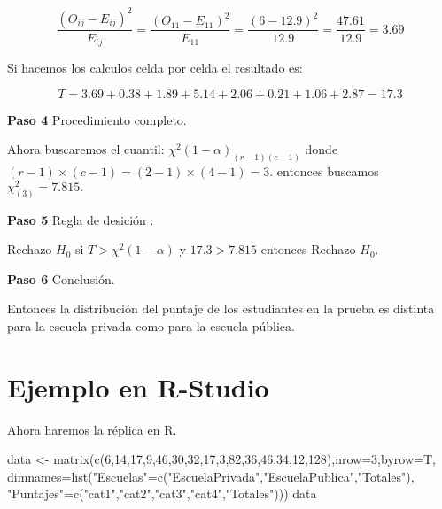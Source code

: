 \documentclass[
  a4paper,
  oneside,
  openany]{book}
\newenvironment{Shaded}{\begin{snugshade}}{\end{snugshade}}
\newcommand{\AttributeTok}[1]{\textcolor[rgb]{0.77,0.63,0.00}{#1}}
\newcommand{\DecValTok}[1]{\textcolor[rgb]{0.00,0.00,0.81}{#1}}
\newcommand{\FunctionTok}[1]{\textcolor[rgb]{0.00,0.00,0.00}{#1}}
\newcommand{\NormalTok}[1]{#1}
\newcommand{\OtherTok}[1]{\textcolor[rgb]{0.56,0.35,0.01}{#1}}
\newcommand{\StringTok}[1]{\textcolor[rgb]{0.31,0.60,0.02}{#1}}
\begin{document}
\[\frac{(O_{ij}-E_{ij})^2}{E_{ij}}= \frac{(O_{11}-E_{11})^2}{E_{11}}=\frac{(6-12.9)^2}{12.9}=\frac{47.61}{12.9}=3.69\]

Si hacemos los calculos celda por celda el resultado es:

\[T=3.69+0.38+1.89+5.14+2.06+0.21+1.06+2.87=17.3\]

\textbf{Paso 4} Procedimiento completo.

Ahora buscaremos el cuantil: \(\chi^2(1-\alpha)_{(r-1)(c-1)}\) donde \((r-1)\times(c-1)=(2-1)\times(4-1)=3.\)
entonces buscamos \(\chi^2_{(3)}=7.815.\)

\textbf{Paso 5} Regla de desición :

Rechazo \(H_0\) si \(T> \chi^2(1-\alpha)\) y \(17.3> 7.815\) entonces Rechazo \(H_0\).

\textbf{Paso 6} Conclusión.

Entonces la distribución del puntaje de los estudiantes en la prueba es distinta para la escuela privada como para la escuela pública.

\hypertarget{ejemplo-en-r-studio-11}{%
\section{Ejemplo en R-Studio}\label{ejemplo-en-r-studio-11}}

Ahora haremos la réplica en R.

\begin{Shaded}
\begin{Highlighting}[]
\NormalTok{data }\OtherTok{\textless{}{-}} \FunctionTok{matrix}\NormalTok{(}\FunctionTok{c}\NormalTok{(}\DecValTok{6}\NormalTok{,}\DecValTok{14}\NormalTok{,}\DecValTok{17}\NormalTok{,}\DecValTok{9}\NormalTok{,}\DecValTok{46}\NormalTok{,}\DecValTok{30}\NormalTok{,}\DecValTok{32}\NormalTok{,}\DecValTok{17}\NormalTok{,}\DecValTok{3}\NormalTok{,}\DecValTok{82}\NormalTok{,}\DecValTok{36}\NormalTok{,}\DecValTok{46}\NormalTok{,}\DecValTok{34}\NormalTok{,}\DecValTok{12}\NormalTok{,}\DecValTok{128}\NormalTok{),}\AttributeTok{nrow=}\DecValTok{3}\NormalTok{,}\AttributeTok{byrow=}\NormalTok{T, }
               \AttributeTok{dimnames=}\FunctionTok{list}\NormalTok{(}\StringTok{"Escuelas"}\OtherTok{=}\FunctionTok{c}\NormalTok{(}\StringTok{"EscuelaPrivada"}\NormalTok{,}\StringTok{"EscuelaPublica"}\NormalTok{,}\StringTok{"Totales"}\NormalTok{), }
                             \StringTok{"Puntajes"}\OtherTok{=}\FunctionTok{c}\NormalTok{(}\StringTok{"cat1"}\NormalTok{,}\StringTok{"cat2"}\NormalTok{,}\StringTok{"cat3"}\NormalTok{,}\StringTok{"cat4"}\NormalTok{,}\StringTok{"Totales"}\NormalTok{)))}
\NormalTok{data}
\end{Highlighting}
\end{Shaded}
\end{document}
